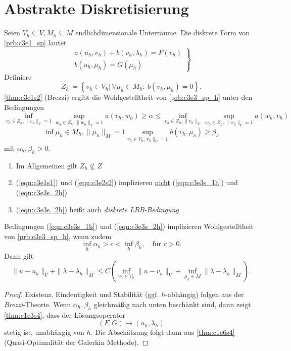 \documentclass[../skript.tex]{subfiles}
\begin{document}
\section{Abstrakte Diskretisierung}\label{sec:c3e3}
Seien $V_h\subseteq V, M_h\subseteq M$ endlichdimensionale Unterräume. Die diskrete Form von \cref{prb:c3e1_sp} lautet
\begin{equation*}
	\left.
		\begin{aligned}
			a(u_h,v_h) + b(v_h,\lambda_h) = F(v_h) \\
			b(u_h,\mu_h) = G(\mu_h)
		\end{aligned}
		\right\}\tag{(SPh)}
		\label{prb:c3e3_sp_h}
\end{equation*}
Definiere
\[
	Z_h \coloneqq \left\{ v_h\in V_h|\,\forall\mu_h\in M_h:\:b(v_h,\mu_h) = 0 \right\}.
\]
\cref{thm:c3e1s2} (Brezzi) ergibt die Wohlgestelltheit von \cref{prb:c3e3_sp_h} unter den Bedingungen
\begin{equation*}
	\inf_{v_h\in Z_h,\|v_h\|_V=1}\sup_{w_h\in Z_h,\|w_h\|_V=1} a(v_h,w_h) \geq\alpha\leq\inf_{v_h\in Z_h,\|v_h\|_V}\sup_{w_h\in Z_h,\|w_h\|_V=1} a(w_h,v_h)\tag{(1h)}\label{eqn:c3e3s_1h}  %
\end{equation*}
\begin{equation*}
	\inf{\mu_h\in M_h,\|\mu_h\|_M=1}\sup_{v_h\in V_h,\,v_h\|_V=1} b(v_h,\mu_h) \geq\beta_h\label{eqn:c3e3s_2h}\tag{(2h)} %
\end{equation*}
mit $\alpha_h,\beta_h > 0$.
\begin{remark}
	\begin{enumerate}
		\item Im Allgemeinen gilt $Z_h\not\subseteq Z$
		\item (\ref{eqn:c3e1s1}) und (\ref{eqn:c3e2s2}) implizieren \underline{nicht} (\ref{eqn:c3e3s_1h}) und (\ref{eqn:c3e3s_2h})
		\item (\ref{eqn:c3e3s_2h}) heißt auch \emph{diskrete LBB-Bedingung}
	\end{enumerate}
\end{remark}

\begin{theorem}\label{thm:c3e3s2}
	Bedingungen (\ref{eqn:c3e3s_1h}) und (\ref{eqn:c3e3s_2h}) implizieren Wohlgestelltheit von \cref{prb:c3e3_sp_h}, wenn zudem 
	\[
		\inf_{h}\alpha_h > c < \inf_h\beta_h,\quad\text{für } c>0.
	\]
	Dann gilt
	\[
		\|u-u_h\|_{V} + \|\lambda-\lambda_h\|_M \leq C\left( \inf_{v_h\in V_h}\|u-v_h\|_V + \inf_{\mu_h\in M}\|\lambda-\lambda_h\|_M \right).
	\]
\end{theorem}
\begin{proof}
	Existenz, Eindeutigkeit und Stabilität (ggf. $h$-abhängig) folgen aus der \emph{Brezzi}-Theorie. Wenn $\alpha_h,\beta_h$ gleichmäßig nach unten beschänkt sind, dann zeigt \cref{thm:c1e3s4}, dass der Lösungsoperator
	\[
		(F,G)\mapsto (u_h,\lambda_h)
	\]
	stetig ist, unabhängig von $h$. Die Abschätzung folgt dann aus \cref{thm:c1e6s4} (Quasi-Optimalität der Galerkin Methode). 
\end{proof}
\end{document}

